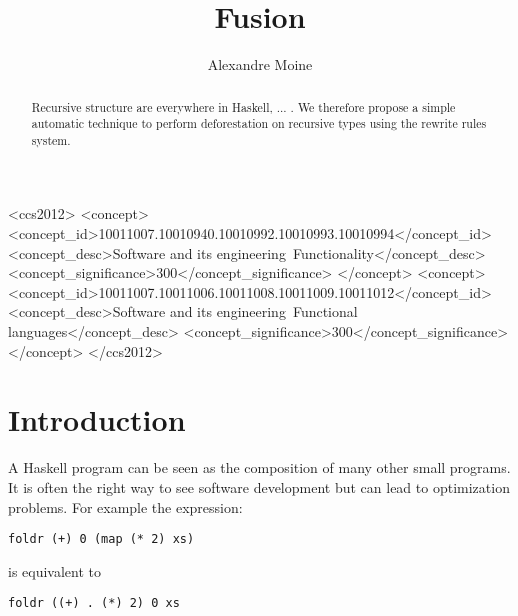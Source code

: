 \documentclass[format=sigplan]{acmart}
\begin{document}
\title{Fusion}
\author{Alexandre Moine}


\begin{abstract}
Recursive structure are everywhere in Haskell, ...  . We therefore propose a simple automatic technique to perform deforestation on recursive types using the rewrite rules system.
\end{abstract}

%

\begin{CCSXML}
	<ccs2012>
	<concept>
	<concept_id>10011007.10010940.10010992.10010993.10010994</concept_id>
	<concept_desc>Software and its engineering~Functionality</concept_desc>
	<concept_significance>300</concept_significance>
	</concept>
	<concept>
	<concept_id>10011007.10011006.10011008.10011009.10011012</concept_id>
	<concept_desc>Software and its engineering~Functional languages</concept_desc>
	<concept_significance>300</concept_significance>
	</concept>
	</ccs2012>
\end{CCSXML}



%


%
\maketitle

\section{Introduction}

A Haskell program can be seen as the composition of many other small programs. It is often the right way to see software development but can lead to optimization problems. For example the expression:
\begin{verbatim}
foldr (+) 0 (map (* 2) xs)
\end{verbatim}
is equivalent to
\begin{verbatim}
foldr ((+) . (*) 2) 0 xs
\end{verbatim}
\end{document}
